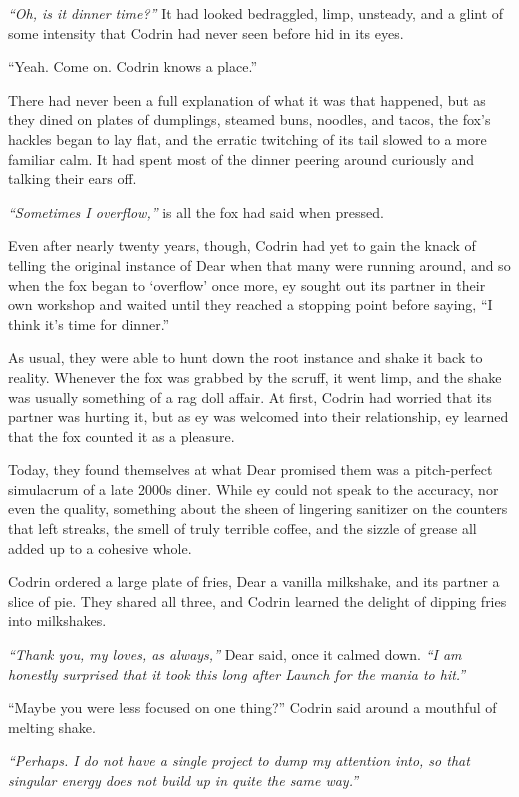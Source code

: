 \emph{``Oh, is it dinner time?''} It had looked bedraggled, limp, unsteady, and a glint of some intensity that Codrin had never seen before hid in its eyes.

``Yeah. Come on. Codrin knows a place.''

There had never been a full explanation of what it was that happened, but as they dined on plates of dumplings, steamed buns, noodles, and tacos, the fox's hackles began to lay flat, and the erratic twitching of its tail slowed to a more familiar calm. It had spent most of the dinner peering around curiously and talking their ears off.

\emph{``Sometimes I overflow,''} is all the fox had said when pressed.

Even after nearly twenty years, though, Codrin had yet to gain the knack of telling the original instance of Dear when that many were running around, and so when the fox began to `overflow' once more, ey sought out its partner in their own workshop and waited until they reached a stopping point before saying, ``I think it's time for dinner.''

As usual, they were able to hunt down the root instance and shake it back to reality. Whenever the fox was grabbed by the scruff, it went limp, and the shake was usually something of a rag doll affair. At first, Codrin had worried that its partner was hurting it, but as ey was welcomed into their relationship, ey learned that the fox counted it as a pleasure.

Today, they found themselves at what Dear promised them was a pitch-perfect simulacrum of a late 2000s diner. While ey could not speak to the accuracy, nor even the quality, something about the sheen of lingering sanitizer on the counters that left streaks, the smell of truly terrible coffee, and the sizzle of grease all added up to a cohesive whole.

Codrin ordered a large plate of fries, Dear a vanilla milkshake, and its partner a slice of pie. They shared all three, and Codrin learned the delight of dipping fries into milkshakes.

\emph{``Thank you, my loves, as always,''} Dear said, once it calmed down. \emph{``I am honestly surprised that it took this long after Launch for the mania to hit.''}

``Maybe you were less focused on one thing?'' Codrin said around a mouthful of melting shake.

\emph{``Perhaps. I do not have a single project to dump my attention into, so that singular energy does not build up in quite the same way.''}

